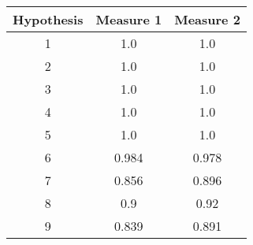 \begin{tabular}{c|cc}
Hypothesis & Measure 1 & Measure 2 \\
\hline
1 & 1.0 & 1.0 \\
2 & 1.0 & 1.0 \\
3 & 1.0 & 1.0 \\
4 & 1.0 & 1.0 \\
5 & 1.0 & 1.0 \\
6 & 0.984 & 0.978 \\
7 & 0.856 & 0.896 \\
8 & 0.9 & 0.92 \\
9 & 0.839 & 0.891 \\
\end{tabular}